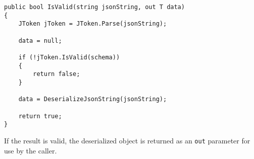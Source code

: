 \begin{lstlisting}[language=CSharp, caption={The \texttt{IsValid} method from the \texttt{JsonValidator} class.}, label={lst:jsonIsValid}]
public bool IsValid(string jsonString, out T data)
{
	JToken jToken = JToken.Parse(jsonString);

	data = null;

	if (!jToken.IsValid(schema))
	{
		return false;
	}

	data = DeserializeJsonString(jsonString);

	return true;
}
\end{lstlisting}

If the result is valid, the deserialized object is returned as an \texttt{out} parameter for use by the caller.
